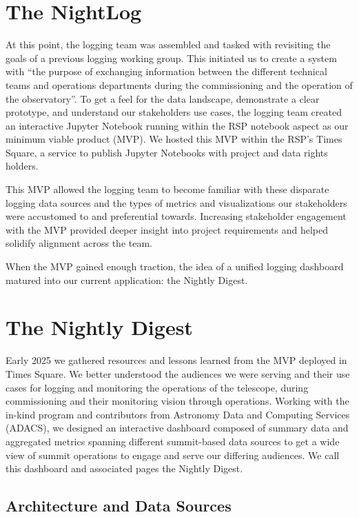 \section{The NightLog}
\label{sec:night log}

At this point, the logging team was assembled and tasked with revisiting the goals of a
previous logging working group. This initiated us to create a system with “the purpose of
exchanging information between the different technical teams and operations departments
during the commissioning and the operation of the observatory”\cite{LSE-490}. To get a
feel for the data landscape, demonstrate a clear prototype, and understand our
stakeholders use cases, the logging team created an interactive Jupyter Notebook running
within the RSP notebook aspect as our minimum viable product (MVP).
We hosted this MVP within the RSP’s Times Square, a service to publish Jupyter Notebooks
with project and data rights holders\cite{SQR-062}.

This MVP allowed the logging team to become familiar with these disparate logging data
sources and the types of metrics and visualizations our stakeholders were accustomed to
and preferential towards. Increasing stakeholder engagement with the MVP provided deeper
insight into project requirements and helped solidify alignment across the team.

When the MVP gained enough traction, the idea of a unified logging dashboard matured into
our current application: the Nightly Digest.



\section{The Nightly Digest}

Early 2025 we gathered resources and lessons learned from the MVP deployed in Times
Square. We better understood the audiences we were serving and
their use cases for logging and monitoring the operations of the telescope, during
commissioning and their monitoring vision through operations. Working with the in-kind
program and contributors from Astronomy Data and Computing Services (ADACS), we designed
an interactive dashboard composed of summary data and aggregated metrics spanning
different summit-based data sources to get a wide view of summit operations to engage and
serve our differing audiences. We call this dashboard and associated pages the Nightly
Digest.

\subsection{Architecture and Data Sources}

